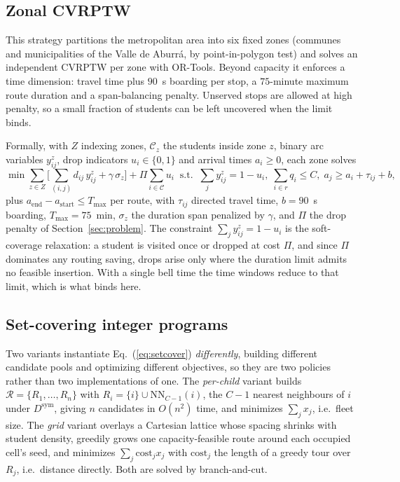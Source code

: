 \documentclass[graybox]{SNmult}
\begin{document}
\subsection{Zonal CVRPTW}\label{sec:cvrptw}
This strategy partitions the metropolitan area into six fixed zones
(communes and municipalities of the Valle de Aburr\'a, by
point-in-polygon test) and solves an independent CVRPTW per zone with
OR-Tools. Beyond capacity it enforces a time dimension: travel time plus
$90$~s boarding per stop, a $75$-minute maximum route duration and a
span-balancing penalty. Unserved stops are allowed at high penalty, so a
small fraction of students can be left uncovered when the limit binds.

Formally, with $Z$ indexing zones, $\mathcal{C}_z$ the students inside
zone $z$, binary arc variables $y^z_{ij}$, drop indicators
$u_i\in\{0,1\}$ and arrival times $a_i\ge0$, each zone solves
\begin{equation}
\min \sum_{z\in Z}\Big[\sum_{(i,j)} d_{ij}\,y^z_{ij} + \gamma\,\sigma_z\Big]
 + \Pi\sum_{i\in\mathcal{C}} u_i
\;\;\text{s.t.}\;\; \textstyle\sum_{j} y^z_{ij} = 1-u_i,\;
\sum_{i\in r} q_i \le C,\; a_j \ge a_i + \tau_{ij} + b,
\label{eq:cvrptw}
\end{equation}
plus $a_{\text{end}}-a_{\text{start}}\le T_{\max}$ per route, with
$\tau_{ij}$ directed travel time, $b=90$~s boarding, $T_{\max}=75$~min,
$\sigma_z$ the duration span penalized by $\gamma$, and $\Pi$ the drop
penalty of Section~\ref{sec:problem}. The constraint
$\sum_j y^z_{ij}=1-u_i$ is the soft-coverage relaxation: a student is
visited once or dropped at cost $\Pi$, and since $\Pi$ dominates any
routing saving, drops arise only where the duration limit admits no
feasible insertion. With a single bell time the time windows reduce to
that limit, which is what binds here.

\subsection{Set-covering integer programs}\label{sec:setcover-two}
Two variants instantiate Eq.~(\ref{eq:setcover}) \emph{differently},
building different candidate pools and optimizing different objectives, so
they are two policies rather than two implementations of one. The
\emph{per-child} variant builds
$\mathcal{R}=\{R_1,\dots,R_n\}$ with $R_i=\{i\}\cup\mathrm{NN}_{C-1}(i)$,
the $C-1$ nearest neighbours of $i$ under $D^{\mathrm{sym}}$, giving $n$
candidates in $O(n^2)$ time, and minimizes $\sum_j x_j$, i.e.\ fleet size.
The \emph{grid} variant overlays a Cartesian lattice whose spacing shrinks
with student density, greedily grows one capacity-feasible route around
each occupied cell's seed, and minimizes
$\sum_j \mathrm{cost}_j x_j$ with $\mathrm{cost}_j$ the length of a greedy
tour over $R_j$, i.e.\ distance directly. Both are solved by
branch-and-cut.
\end{document}

